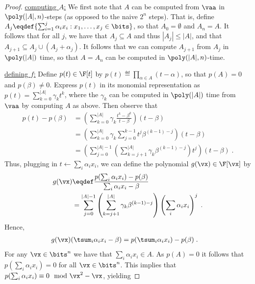 \documentclass[11pt]{article}
\numberwithin{equation}{section}
\theoremstyle{definition}
\theoremstyle{plain}
\begin{document}
\begin{proof}
        \uline{computing $A$:} We first note that $A$ can be computed from $\vaa$ in $\poly(|A|,n)$-steps (as opposed to the naive $2^n$ steps).  That is, define $A_j\eqdef\{\sum_{i=1}^j \alpha_i x_i : x_1,\ldots,x_j\in\bits\}$, so that $A_0=\emptyset$ and $A_n=A$.  It follows that for all $j$, we have that $A_j\subseteq A$ and thus $|A_j|\le |A|$, and that $A_{j+1}\subseteq A_j\cup (A_j+\alpha_j)$.  It follows that we can compute $A_{j+1}$ from $A_j$ in $\poly(|A|)$ time, so that $A=A_n$ can be computed in $\poly(|A|,n)$-time.

        \uline{defining $f$:}
        Define $p(t)\in\F[t]$ by $p(t)\eqdef\prod_{\alpha\in A}(t-\alpha)$, so that $p(A)=0$ and $p(\beta)\ne 0$.  Express $p(t)$ in its monomial representation as $p(t)=\sum_{k=0}^{|A|} \gamma_k t^k$, where the $\gamma_k$ can be computed in $\poly(|A|)$ time from $\vaa$ by computing $A$ as above.  Then observe that
        \begin{align*}
                p(t)-p(\beta)
                &=\left(\sum_{k=0}^{|A|} \gamma_k\frac{t^k-\beta^k}{t-\beta}\right)(t-\beta)\\
                &=\left(\sum_{k=0}^{|A|} \gamma_k\sum_{j=0}^{k-1} t^{j}\beta^{(k-1)-j}\right)(t-\beta)\\
                &=\left(\sum_{j=0}^{|A|-1}\left(\sum_{k=j+1}^{|A|} \gamma_k\beta^{(k-1)-j} \right)t^j\right)(t-\beta)
                \;.
        \end{align*}
        Thus, plugging in $t\leftarrow \sum_i \alpha_i x_i$, we can define the polynomial $g(\vx)\in\F[\vx]$ by
        \begin{align}
                g(\vx)
                &\eqdef\frac{p(\sum_i \alpha_i x_i)-p(\beta)}{\sum_i \alpha_i x_i -\beta}\nonumber\\
                &=\sum_{j=0}^{|A|-1}\left(\sum_{k=j+1}^{|A|} \gamma_k\beta^{(k-1)-j} \right) \left(\sum_i \alpha_i x_i\right)^j\label{eq:subset}
                \;.
        \end{align}
        Hence,
        \begin{align*}
                g(\vx) (\tsum_i \alpha_ix_i-\beta)
                &=p(\tsum_i \alpha_i x_i)-p(\beta)
                \;.
        \end{align*}
        For any $\vx\in\bits^n$ we have that $\sum_i \alpha_i x_i\in A$.  As $p(A)=0$ it follows that $p(\sum_i \alpha_i x_i)=0$ for all $\vx\in\bits^n$. This implies that $p(\sum_i \alpha_i x_i)\equiv 0 \mod \vx^2-\vx$, yielding

\end{proof}
\end{document}
